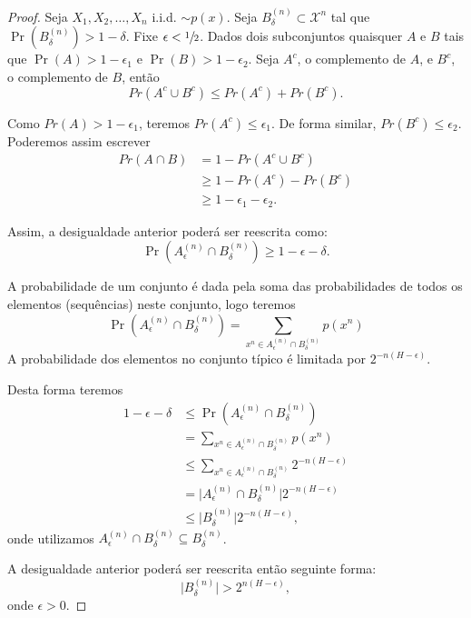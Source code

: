 \begin{proof}
Seja $X_1, X_2, \ldots, X_n$ i.i.d. $\sim p(x)$. Seja $B_{\delta}^{(n)} \subset \mathcal{X}^n$ tal que
$\Pr(B_{\delta}^{(n)}) > 1 - \delta$. Fixe $\epsilon < \sfrac{1}{2}$.
Dados dois subconjuntos quaisquer $A$ e $B$ tais que $\Pr(A) > 1 - \epsilon_1$ e $\Pr(B) > 1 - \epsilon_2$.
Seja $A^c$, o complemento de $A$, e $B^c$, o complemento de $B$, então
\begin{equation}
Pr(A^c \cup B^c) \leq Pr(A^c) + Pr(B^c) .
\end{equation}

Como $Pr(A) > 1 - \epsilon_1$, teremos $Pr(A^c) \leq \epsilon_1$. De forma similar, $Pr(B^c) \leq \epsilon_2$.
Poderemos assim escrever
\begin{subequations}
\begin{align}
Pr(A \cap B) &= 1 - Pr(A^c \cup B^c) \\
        &\geq 1 - Pr(A^c) - Pr(B^c) \\
        &\geq 1 - \epsilon_1 - \epsilon_2.
\end{align}
\end{subequations}

Assim, a desigualdade anterior poderá ser reescrita como:
\begin{equation}
\Pr(A_{\epsilon}^{(n)} \cap B_{\delta}^{(n)}) \geq 1 - \epsilon - \delta .
\end{equation}

A probabilidade de um conjunto é dada pela soma das probabilidades de todos os elementos (sequências) neste conjunto, logo teremos
\begin{equation}
\Pr(A_{\epsilon}^{(n)} \cap B_{\delta}^{(n)}) = \sum_{x^n \in A_{\epsilon}^{(n)} \cap B_{\delta}^{(n)}} p(x^n)
\end{equation}
A probabilidade dos elementos no conjunto típico é limitada por $2^{-n(H-\epsilon)}$.

Desta forma teremos
\begin{subequations}
\begin{align}
 1 - \epsilon - \delta &\leq \Pr(A_{\epsilon}^{(n)} \cap B_{\delta}^{(n)}) \\
                &= \sum_{x^n \in A_{\epsilon}^{(n)} \cap B_{\delta}^{(n)}} p(x^n) \\
                &\leq \sum_{x^n \in A_{\epsilon}^{(n)} \cap B_{\delta}^{(n)}} 2^{-n(H-\epsilon)} \\
                &= \vert A_{\epsilon}^{(n)} \cap B_{\delta}^{(n)} \vert 2^{-n(H-\epsilon)} \\
                &\leq \vert B_{\delta}^{(n)} \vert 2^{-n(H-\epsilon)},
\end{align}
\end{subequations}
onde utilizamos $A_{\epsilon}^{(n)} \cap B_{\delta}^{(n)} \subseteq B_{\delta}^{(n)}$.

A desigualdade anterior poderá ser reescrita então seguinte forma:
\begin{equation}
\vert B_{\delta}^{(n)} \vert  >  2^{n(H-\epsilon)} ,
\end{equation}
onde $\epsilon > 0$.
\end{proof}
